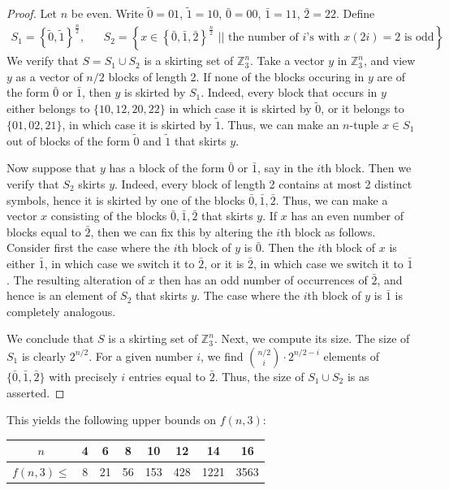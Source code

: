 \documentclass[12pt,reqno]{article}
\newcommand{\ZZ}{\mathbb Z}
\newcommand{\sett}[2]{ \left\{ #1 \, \, || \, \, #2 \right \} }
\begin{document}
\begin{proof}
Let $n$ be even.
Write $\tilde 0 = 01$, $\tilde 1 = 10$, $\bar 0 = 00$, $\bar 1 = 11$, $\bar 2 = 22$.
Define
\begin{align*}
 S_1 = \left\{ \tilde 0, \tilde 1 \right \}^{\frac n2}, &&
 S_2 = \sett{ x \in \left \{ \bar 0, \bar 1, \bar 2 \right \}^{\frac n2} }{ \text{the number of $i$'s with $x(2i) = 2$ is odd}}.
\end{align*}
We verify that $S = S_1 \cup S_2$ is a skirting set of $\ZZ_3^n$.
Take a vector $y$ in $\ZZ_3^n$, and view $y$ as a vector of $n/2$ blocks of length 2.
If none of the blocks occuring in $y$ are of the form $\bar 0$ or $\bar 1$, then $y$ is skirted by $S_1$.
Indeed, every block that occurs in $y$ either belongs to $\{10, 12, 20, 22 \}$ in which case it is skirted by $\tilde 0$, or it belongs to $\{01, 02, 21 \}$, in which case it is skirted by $\tilde 1$.
Thus, we can make an $n$-tuple $x \in S_1$ out of blocks of the form $\tilde 0$ and $\tilde 1$ that skirts $y$.

Now suppose that $y$ has a block of the form $\bar 0$ or $\bar 1$, say in the $i$th block.
Then we verify that $S_2$ skirts $y$.
Indeed, every block of length 2 contains at most 2 distinct symbols, hence it is skirted by one of the blocks $\bar 0, \bar 1, \bar 2$.
Thus, we can make a vector $x$ consisting of the blocks $\bar 0, \bar 1, \bar 2$ that skirts $y$.
If $x$ has an even number of blocks equal to $\bar 2$, then we can fix this by altering the $i$th block as follows.
Consider first the case where the $i$th block of $y$ is $\bar 0$.
Then the $i$th block of $x$ is either $\bar 1$, in which case we switch it to $\bar 2$, or it is $\bar 2$, in which case we switch it to $\bar 1$.
The resulting alteration of $x$ then has an odd number of occurrences of $\bar 2$, and hence is an element of $S_2$ that skirts $y$.
The case where the $i$th block of $y$ is $\bar 1$ is completely analogous.

We conclude that $S$ is a skirting set of $\ZZ_3^n$.
Next, we compute its size.
 The size of $S_1$ is clearly $2^{n/2}$.
 For a given number $i$, we find $\binom{n/2}{i} \cdot 2^{n/2-i}$
 elements of $\{ \bar{0}, \bar{1}, \bar{2}\}$ 
 with precisely $i$ entries equal to $\bar{2}$.
 Thus, the size of $S_1 \cup S_2$ is as asserted.
\end{proof}

This yields the following upper bounds on $f(n, 3)$:

\begin{center}
\begin{tabular}{c | c c c c c c c}
 $n$ & 4 & 6 & 8 & 10 & 12 & 14 & 16 \\ \hline
 $f(n,3) \leq$ & 8 & 21 & 56 & 153 & 428 & 1221 & 3563
\end{tabular}
\end{center}
\end{document}
